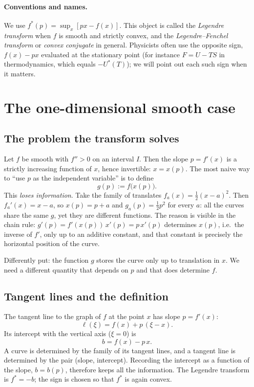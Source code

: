 \paragraph{Conventions and names.}
We use $f^*(p)=\sup_x[px-f(x)]$.  This object is called the
\emph{Legendre transform} when $f$ is smooth and strictly convex, and the
\emph{Legendre--Fenchel transform} or \emph{convex conjugate} in general.
Physicists often use the opposite sign, $f(x)-px$ evaluated at the stationary
point (for instance $F=U-TS$ in thermodynamics, which equals $-U^*(T)$); we
will point out each such sign when it matters.
\section{The one-dimensional smooth case}\label{sec:1d}

\subsection{The problem the transform solves}

Let $f$ be smooth with $f''>0$ on an interval $I$.  Then the slope
$p=f'(x)$ is a strictly increasing function of $x$, hence invertible:
$x=x(p)$.  The most naive way to ``use $p$ as the independent variable'' is
to define
\[
  g(p):=f\bigl(x(p)\bigr).
\]
This \emph{loses information}.  Take the family of translates
$f_a(x)=\tfrac12(x-a)^2$.  Then $f_a'(x)=x-a$, so $x(p)=p+a$ and
$g_a(p)=\tfrac12 p^2$ for every $a$: all the curves share the same $g$, yet
they are different functions.  The reason is visible in the chain rule:
$g'(p)=f'(x(p))\,x'(p)=p\,x'(p)$ determines $x(p)$, i.e.\ the inverse of
$f'$, only up to an additive constant, and that constant is precisely the
horizontal position of the curve.

Differently put: the function $g$ stores the curve only up to translation in
$x$.  We need a different quantity that depends on $p$ and that does
determine $f$.

\subsection{Tangent lines and the definition}

The tangent line to the graph of $f$ at the point $x$ has slope $p=f'(x)$:
\[
  \ell(\xi)=f(x)+p\,(\xi-x).
\]
Its intercept with the vertical axis ($\xi=0$) is
\[
  b = f(x)-p\,x .
\]
A curve is determined by the family of its tangent lines, and a tangent line
is determined by the pair (slope, intercept).  Recording the intercept as a
function of the slope, $b=b(p)$, therefore keeps all the information.  The
Legendre transform is $f^*=-b$; the sign is chosen so that $f^*$ is again
convex.

